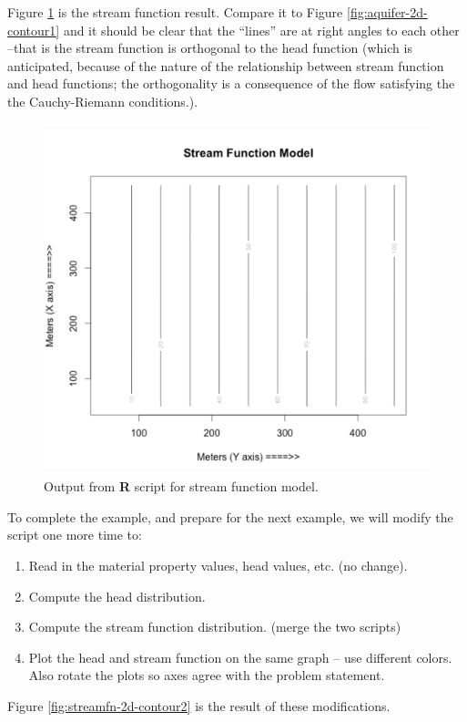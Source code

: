 Figure \ref{fig:streamfn-2d-contour1} is the stream function result.  
Compare it to Figure \ref{fig:aquifer-2d-contour1} and it should be clear that the ``lines'' are at right angles to each other --that is the stream function is orthogonal to the head function (which is anticipated, because of the nature of the relationship between stream function and head functions; the orthogonality is a consequence of the flow satisfying the the Cauchy-Riemann conditions.).

\begin{figure}[h!] %
   \centering
   \includegraphics[height=4in]{./19-FlowNets/streamfn-2d-contour1.jpg} 
   \caption{Output from \textbf{R} script for stream function model.}
   \label{fig:streamfn-2d-contour1}
\end{figure}

To complete the example, and prepare for the next example, we will modify the script one more time to:
\begin{enumerate}
\item Read in the material property values, head values, etc.  (no change).
\item Compute the head distribution.
\item Compute the stream function distribution. (merge the two scripts)
\item Plot the head and stream function on the same graph -- use different colors.  Also rotate the plots so axes agree with the problem statement.
\end{enumerate}

Figure \ref{fig:streamfn-2d-contour2} is the result of these modifications.  



